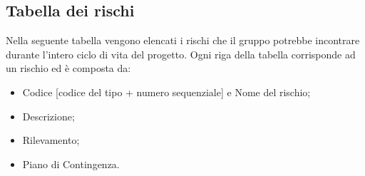 \subsection{Tabella dei rischi}
Nella seguente tabella vengono elencati i rischi che il gruppo \Gruppo{} potrebbe incontrare durante l'intero ciclo di vita del progetto.
Ogni riga della tabella corrisponde ad un rischio ed è composta da:
\begin{itemize}
	\item Codice [codice del tipo + numero sequenziale] e Nome del rischio;
	\item Descrizione;
	\item Rilevamento;
	\item Piano di Contingenza.
\end{itemize}

